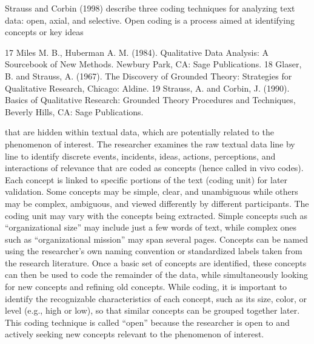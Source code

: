 Strauss and Corbin (1998) describe three coding techniques for analyzing text data: open, axial, and selective. Open coding is a process aimed at identifying concepts or key ideas 

17 Miles M. B., Huberman A. M. (1984). Qualitative Data Analysis: A Sourcebook of New Methods. Newbury Park, CA: Sage Publications. 18 Glaser, B. and Strauss, A. (1967). The Discovery of Grounded Theory: Strategies for Qualitative Research, Chicago: Aldine. 19 Strauss, A. and Corbin, J. (1990). Basics of Qualitative Research: Grounded Theory Procedures and Techniques, Beverly Hills, CA: Sage Publications.

that are hidden within textual data, which are potentially related to the phenomenon of interest. The researcher examines the raw textual data line by line to identify discrete events, incidents, ideas, actions, perceptions, and interactions of relevance that are coded as concepts (hence called in vivo codes). Each concept is linked to specific portions of the text (coding unit) for later validation. Some concepts may be simple, clear, and unambiguous while others may be complex, ambiguous, and viewed differently by different participants. The coding unit may vary with the concepts being extracted. Simple concepts such as “organizational size” may include just a few words of text, while complex ones such as “organizational mission” may span several pages. Concepts can be named using the researcher’s own naming convention or standardized labels taken from the research literature. Once a basic set of concepts are identified, these concepts can then be used to code the remainder of the data, while simultaneously looking for new concepts and refining old concepts. While coding, it is important to identify the recognizable characteristics of each concept, such as its size, color, or level (e.g., high or low), so that similar concepts can be grouped together later. This coding technique is called “open” because the researcher is open to and actively seeking new concepts relevant to the phenomenon of interest.

